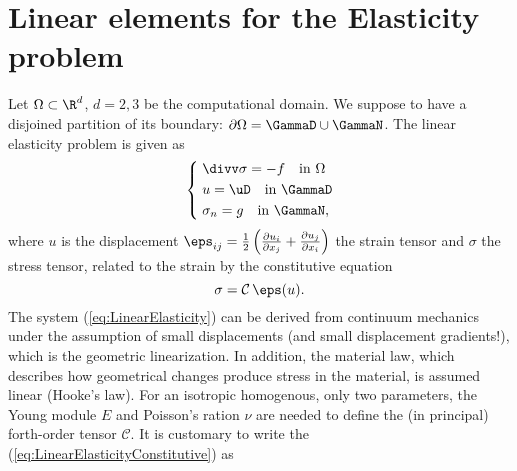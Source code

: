 %
\section{Linear elements for the Elasticity problem}\label{sec:}
%
Let $\Omega\subset \R^d$, $d=2,3$ be the computational domain. 
We suppose to have a disjoined partition of its boundary: $\partial\Omega=\GammaD\cup\GammaN$.
The linear elasticity problem is given as
%
\begin{equation}\label{eq:LinearElasticity}
%
\left\{
\begin{aligned}
&\;\divv\sigma = -f \quad \mbox{in $\Omega$}\\
&\;u = \uD \quad \mbox{in $\GammaD$}\\
&\;\sigma_n = g \quad \mbox{in $\GammaN$},
\end{aligned}
\right.
%
\end{equation}
%
where $u$ is the displacement $\eps_{ij}=\frac12\left(\frac{\partial u_i}{\partial x_j}+\frac{\partial u_j}{\partial x_i}\right)$ the strain tensor and $\sigma$ the stress tensor, related to the strain by the constitutive equation
%
\begin{equation}\label{eq:LinearElasticityConstitutive}
\sigma = \mathcal C\, \eps(u).
\end{equation}
% 
The system (\ref{eq:LinearElasticity}) can be derived from continuum mechanics under the assumption of small displacements (and small displacement gradients!), which is the geometric linearization. In addition, the material law, which describes how geometrical changes produce stress in the material, is assumed linear (Hooke's law). 
For an isotropic homogenous, only two parameters, the Young module $E$ and Poisson's ration $\nu$ are needed to define the (in principal) forth-order tensor $\mathcal C$. It is customary to write the (\ref{eq:LinearElasticityConstitutive}) as
%
